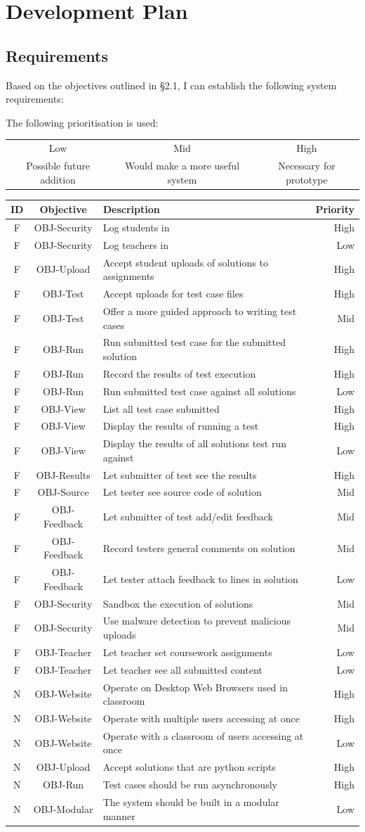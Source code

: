 \documentclass[a4paper,11pt]{report}
\newcounter{FunCount}
\newcounter{NFunCount}
\newcommand{\freq}[3]{\addtocounter{FunCount}{1}F\arabic{FunCount} & OBJ-#1 & #2 & #3\\}
\newcommand{\nfreq}[3]{\addtocounter{NFunCount}{1}N\arabic{NFunCount} & OBJ-#1 & #2 & #3\\}
\begin{document}
\chapter{Development Plan}

\section{Requirements}
Based on the objectives outlined in \S 2.1, I can establish the following system requirements:\par
The following prioritisation is used:\\
\begin{tabular}{ccc}
 Low & Mid & High\\
 Possible future addition & Would make a more useful system & Necessary for prototype
\end{tabular}

\begin{longtable}{cclr}
\textbf{ID} & \textbf{Objective} & \textbf{Description} & \textbf{Priority}\\\hline
\freq{Security}{Log students in}{High}
\freq{Security}{Log teachers in}{Low}
\freq{Upload}{Accept student uploads of solutions to assignments}{High}
\freq{Test}{Accept uploads for test case files}{High}
\freq{Test}{Offer a more guided approach to writing test cases}{Mid}
\freq{Run}{Run submitted test case for the submitted solution}{High}
\freq{Run}{Record the results of test execution}{High}
\freq{Run}{Run submitted test case against all solutions}{Low}
\freq{View}{List all test case submitted}{High}
\freq{View}{Display the results of running a test}{High}
\freq{View}{Display the results of all solutions test run against}{Low}
\freq{Results}{Let submitter of test see the results}{High}
\freq{Source}{Let tester see source code of solution}{Mid}
\freq{Feedback}{Let submitter of test add/edit feedback}{Mid}
\freq{Feedback}{Record testers general comments on solution}{Mid}
\freq{Feedback}{Let tester attach feedback to lines in solution}{Low}
\freq{Security}{Sandbox the execution of solutions}{Mid}                                                                                                                               
\freq{Security}{Use malware detection to prevent malicious uploads}{Mid}
\freq{Teacher}{Let teacher set coursework assignments}{Low}
\freq{Teacher}{Let teacher see all submitted content}{Low}
\nfreq{Website}{Operate on Desktop Web Browsers used in classroom}{High}
\nfreq{Website}{Operate with multiple users accessing at once}{High}
\nfreq{Website}{Operate with a classroom of users accessing at once}{Low}
\nfreq{Upload}{Accept solutions that are python scripts}{High}
\nfreq{Run}{Test cases should be run asynchronously}{High}
\nfreq{Modular}{The system should be built in a modular manner}{Low}
\end{longtable}
\end{document}
